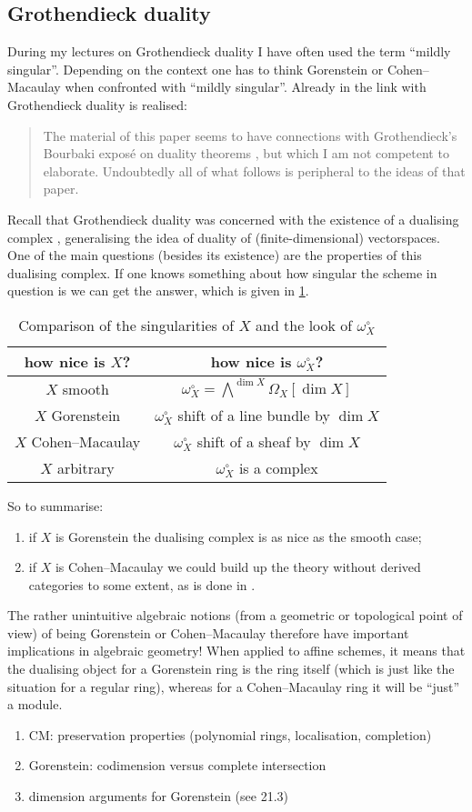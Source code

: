 \documentclass[10pt,a4paper]{article}
\begin{document}
\subsection{Grothendieck duality}
During my lectures on Grothendieck duality I have often used the term ``mildly singular''. Depending on the context one has to think Gorenstein or Cohen--Macaulay when confronted with ``mildly singular''. Already in \cite{bass-ubiquity-gorenstein-rings} the link with Grothendieck duality is realised:
\begin{quote}
  The material of this paper seems to have connections with Grothendieck's Bourbaki expos\'e on duality theorems \cite{grothendieck-theoremes-de-dualite}, but which I am not competent to elaborate. Undoubtedly all of what follows is peripheral to the ideas of that paper.
\end{quote}
Recall that Grothendieck duality was concerned with the existence of a dualising complex \cite{hartshorne-residues-and-duality}, generalising the idea of duality of (finite-dimensional) vectorspaces. One of the main questions (besides its existence) are the properties of this dualising complex. If one knows something about how singular the scheme in question is we can get the answer, which is given in \cref{table:comparison-X-dualising-sheaf}.
\begin{table}[ht]
  \centering
  \begin{tabular}{cc}
    \toprule
    how nice is $X$? & how nice is $\omega_X^\circ$? \\\midrule
    $X$ smooth & $\omega_X^\circ=\bigwedge^{\dim X}\Omega_X[\dim X]$ \\
    $X$ Gorenstein & $\omega_X^\circ$ shift of a line bundle by $\dim X$ \\
    $X$ Cohen--Macaulay & $\omega_X^\circ$ shift of a sheaf by $\dim X$ \\
    $X$ arbitrary & $\omega_X^\circ$ is a complex \\
    \bottomrule
  \end{tabular}
  \caption{Comparison of the singularities of $X$ and the look of $\omega_X^\circ$}
  \label{table:comparison-X-dualising-sheaf}
\end{table}
So to summarise:
\begin{enumerate}
  \item if $X$ is Gorenstein the dualising complex is as nice as the smooth case;
  \item if $X$ is Cohen--Macaulay we could build up the theory without derived categories to some extent, as is done in \cite{hartshorne-algebraic-geometry}.
\end{enumerate}
The rather unintuitive algebraic notions (from a geometric or topological point of view) of being Gorenstein or Cohen--Macaulay therefore have important implications in algebraic geometry! When applied to affine schemes, it means that the dualising object for a Gorenstein ring is the ring itself (which is just like the situation for a regular ring), whereas for a Cohen--Macaulay ring it will be ``just'' a module.


\begin{enumerate}
  \item CM: preservation properties (polynomial rings, localisation, completion)
  \item Gorenstein: codimension versus complete intersection
  \item dimension arguments for Gorenstein (see 21.3)
\end{enumerate}

\printbibliography
\end{document}
